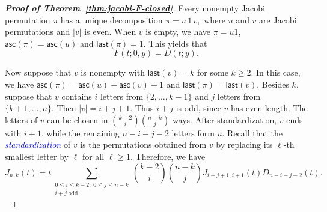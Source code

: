 \documentclass[12pt]{article}
\def\blue{\textcolor{blue}}
\def\blue{\textcolor{blue}}
\numberwithin{equation}{section}
\def\blue{\textcolor{blue}}
\def\blue{\textcolor{blue}}
\theoremstyle{plain}
\def\asc{\mathsf{asc}}
\def\last{\mathsf{last}}
\begin{document}
   			\begin{proof}[{\bf Proof of Theorem~\ref{thm:jacobi-F-closed}}] 
   			Every nonempty Jacobi permutation $\pi$ has a unique decomposition
   			$
   			\pi=u\,1\,v,
   			$
   			where   $u$ and $v$ are Jacobi permutations and
   			$|v|$ is even.  When $v$ is empty, we have $\pi=u1$, $\asc(\pi)=\asc(u)$ and $\last(\pi)=1$. This yields that
   			\begin{equation}
   				F(t;0,y)=D(t;y).
   				\label{eq:jacobi-F-boundary}
   			\end{equation}
   			
   			Now suppose that $v$ is nonempty with $\last(v)=k$ for some  $k\geq 2$.  In this case, we have $\asc(\pi)=\asc(u)+\asc(v)+1$ and $\last(\pi)=\last(v)$.
   			Besides $k$, suppose
   			that $v$ contains $i$ letters  from $\{2,\ldots,k-1\}$ and $j$ letters  from
   			$\{k+1,\ldots,n\}$.  Then $|v|=i+j+1$.  Thus $i+j$ is odd, since $v$
   			has even length.  The letters of $v$ can be chosen in
   			$\binom{k-2}{i}\binom{n-k}{j}$ ways.  After standardization, $v$ ends
   			with $i+1$, while the remaining $n-i-j-2$ letters form $u$.  Recall that the \blue{\em standardization }of $v$ is the permutations obtained from $v$ by replacing  its $\ell$-th smallest letter by $\ell$ for all $\ell\geq1$.   Therefore, we have
   			\begin{equation}
   				 J_{n,k}(t)
   				=t\!\sum_{\substack{0\leq i\leq k-2,\;0\leq j\leq n-k\\
   						i+j\;\mathrm{odd}}}
   				\binom{k-2}{i}\binom{n-k}{j}
   				 J_{i+j+1,i+1}(t)D_{n-i-j-2}(t).
   				\label{eq:jacobi-J-recurrence}
   			\end{equation}
   			

\end{proof}
\end{document}
